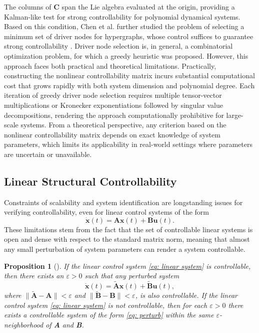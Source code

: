 \documentclass[journal,twoside,web]{ieeecolor}
\newtheorem{proposition}{Proposition}
\begin{document}
The columns of $\textbf{C}$ span the Lie algebra evaluated at the origin, providing a Kalman-like test for strong controllability for polynomial dynamical systems.
%
Based on this condition, Chen et al. further studied the problem of selecting a minimum set of driver nodes for hypergraphs, whose control suffices to guarantee strong controllability \cite{chen2021controllability}.
%
Driver node selection is, in general, a combinatorial optimization problem, for which a greedy heuristic was proposed.
%
However, this approach faces both practical and theoretical limitations.
%
Practically, constructing  the nonlinear controllability matrix incurs substantial computational cost that grows rapidly with both system dimension and polynomial degree.
%
Each iteration of greedy driver node selection requires multiple tensor-vector multiplications or Kronecker exponentiations followed by singular value decompositions, rendering the approach computationally prohibitive for large-scale systems.
%
From a theoretical perspective, any criterion based on the nonlinear controllability matrix depends on exact knowledge of system parameters, which limits its applicability in real-world settings where parameters are uncertain or unavailable.



\subsection{Linear Structural Controllability}
Constraints of scalability and system identification are longstanding issues for verifying controllability, even for linear control systems of the form
\begin{equation}\label{eq: linear system}
    \dot{\textbf{x}}(t)= \textbf{A} \textbf{x}(t) + \textbf{B} \textbf{u}(t).
\end{equation}
These limitations stem from the fact that the set of controllable linear systems is open and dense with respect to the standard matrix norm, meaning that almost any small perturbation of system parameters can render a system controllable.



\begin{proposition}[\cite{lee1967foundations}]\label{thm: Av Bv is open and dense}
    If the linear control system \eqref{eq: linear system} is controllable, then there exists an $\varepsilon>0$ such that any perturbed system
    \begin{equation}\label{eq: perturb}
        \dot{\textbf{x}}(t)=\tilde{\textbf{A}}\textbf{x}(t)+\tilde{\textbf{B}}\textbf{u}(t),
    \end{equation}
    where $\|\tilde{\textbf{A}}-\textbf{A}\|<\varepsilon$ and $\|\tilde{\textbf{B}}-\textbf{B}\|<\varepsilon$, is also controllable. If the linear control system \eqref{eq: linear system} is not controllable, then for each $\varepsilon>0$ there exists a controllable system of the form \eqref{eq: perturb} within the same $\varepsilon$-neighborhood of \textbf{A} and \textbf{B}.
\end{proposition}
\end{document}
